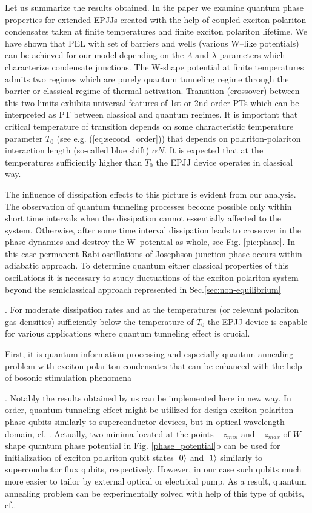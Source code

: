 \documentclass[aps, pre, preprint, groupedaddress, superscriptaddress, showkeys, showpacs] {revtex4-1}
\DeclarePairedDelimiter\ket{\lvert}{\rangle}
\begin{document}
{{{Let us summarize the results obtained. In the paper we examine quantum phase properties for  extended EPJJs created with the help of coupled exciton polariton condensates taken at finite temperatures and finite exciton polariton lifetime. We have shown that  PEL with set of barriers and wells (various W--like potentials) can be achieved for our model  depending on the $\Lambda$ and $\lambda$ parameters which characterize condensate junctions. The W-shape potential at finite temperatures admits two regimes which are  purely quantum tunneling regime through the barrier or classical regime of thermal activation.   Transition (crossover) between this two limits exhibits universal features of 1st or 2nd order PTs which can be interpreted as PT between classical and quantum regimes. It is important that critical temperature of transition depends on some  characteristic temperature  parameter $T_{0}$ (see e.g. (\ref{eq:second_order})) that depends on polariton-polariton interaction length (so-called blue shift) $\alpha N$.  It is expected that  at the temperatures sufficiently higher than  $T_{0}$ the EPJJ device operates in classical way. 

The influence of dissipation effects to this picture is evident from our analysis. The observation of quantum tunneling processes become possible only within short time intervals when the dissipation cannot essentially affected to the system.
Otherwise, after some time interval dissipation leads to crossover in the phase dynamics and destroy the W--potential as whole, see Fig. \ref{pic:phase}. In this case permanent Rabi  oscillations of Josephson junction phase occurs within adiabatic approach. To determine quantum either classical properties of this oscillations it is necessary to study fluctuations of the exciton polariton system beyond the semiclassical approach represented in Sec.\ref{sec:non-equilibrium}}. 
For moderate dissipation rates and at the temperatures (or relevant polariton gas densities) sufficiently below the temperature of $T_{0}$   the EPJJ device is  capable for various applications where quantum tunneling effect is crucial. 

First, it is quantum information processing and especially quantum annealing problem  with exciton polariton condensates that can be enhanced with the help of bosonic stimulation phenomena {\cite{Yan}. Notably the results obtained by us can be implemented  here in new way.  In order, quantum tunneling effect might be utilized  for design exciton polariton phase qubits similarly to superconductor devices, but in optical wavelength domain, cf. \cite{Makhlin}. Actually,  two minima located at the points $-z_{min}$ and $+z_{max}$ of $W$-shape quantum phase potential in Fig. \ref{phase_potential}b can be used for initialization of exciton polariton qubit states $\ket{0}$ and $\ket{1}$ similarly to superconductor flux qubits, respectively. However, in our case such qubits much more easier to tailor by external optical or electrical pump. As a result, quantum annealing problem can be experimentally solved   
with help of this type of qubits, cf.\cite{Johnson}.  
 
}}}
\end{document}
